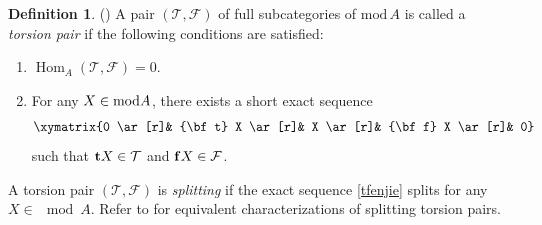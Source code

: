 \documentclass[reqno,12pt]{amsart}
\numberwithin{equation}{section}
\theoremstyle{plain}
\theoremstyle{definition}
\newtheorem{definition}[theorem]{\bf Definition}
\begin{document}
\begin{definition}\label{tp} (\cite{ASS})
A pair \((\mathcal{T}, \mathcal{F})\) of full subcategories of \(\mathrm{mod}\, A\) is called a {\em torsion pair} if the following conditions are satisfied:
\begin{enumerate}
\item[(1)] $\operatorname{Hom}_A(\mathcal{T},\mathcal{F})=0$.
\item[(2)] For any $X\in{\rm mod} A$, there exists a short exact sequence
\begin{equation}\label{tfenjie}
\xymatrix{0 \ar[r]& {\bf t} X \ar[r]& X \ar[r]& {\bf f} X \ar[r]& 0}\end{equation}
such that ${\bf t} X \in \mathcal{T}$ and ${\bf f} X \in \mathcal{F}$.
\end{enumerate}
A torsion pair \((\mathcal{T}, \mathcal{F})\) is {\em splitting} if the exact sequence \eqref{tfenjie} splits for any $X\in\mod A$. Refer to \cite[VI Proposition 1.7]{ASS} for equivalent characterizations of splitting torsion pairs.
\end{definition}
\end{document}

